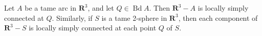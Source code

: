 Let $A$ be a tame arc in $\mathbf{R}^3$, and let $Q \in \operatorname{Bd} A$. Then $\mathbf{R}^3 - A$ is locally simply connected at $Q$. Similarly, if $S$ is a tame 2-sphere in $\mathbf{R}^3$, then each component of $\mathbf{R}^3 - S$ is locally simply connected at each point $Q$ of $S$.
